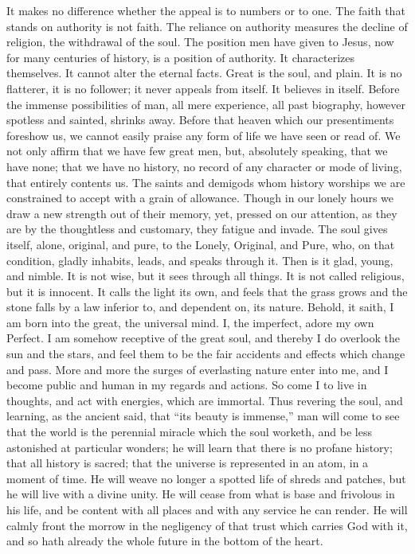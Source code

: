 \documentclass{article}
\begin{document}
It makes no difference whether the appeal is to numbers or to one. The faith that stands on authority is not faith. The reliance on authority measures the decline of religion, the withdrawal of the soul. The position men have given to Jesus, now for many centuries of history, is a position of authority. It characterizes themselves. It cannot alter the eternal facts. Great is the soul, and plain. It is no flatterer, it is no follower; it never appeals from itself. It believes in itself. Before the immense possibilities of man, all mere experience, all past biography, however spotless and sainted, shrinks away. Before that heaven which our presentiments foreshow us, we cannot easily praise any form of life we have seen or read of. We not only affirm that we have few great men, but, absolutely speaking, that we have none; that we have no history, no record of any character or mode of living, that entirely contents us. The saints and demigods whom history worships we are constrained to accept with a grain of allowance. Though in our lonely hours we draw a new strength out of their memory, yet, pressed on our attention, as they are by the thoughtless and customary, they fatigue and invade. The soul gives itself, alone, original, and pure, to the Lonely, Original, and Pure, who, on that condition, gladly inhabits, leads, and speaks through it. Then is it glad, young, and nimble. It is not wise, but it sees through all things. It is not called religious, but it is innocent. It calls the light its own, and feels that the grass grows and the stone falls by a law inferior to, and dependent on, its nature. Behold, it saith, I am born into the great, the universal mind. I, the imperfect, adore my own Perfect. I am somehow receptive of the great soul, and thereby I do overlook the sun and the stars, and feel them to be the fair accidents and effects which change and pass. More and more the surges of everlasting nature enter into me, and I become public and human in my regards and actions. So come I to live in thoughts, and act with energies, which are immortal. Thus revering the soul, and learning, as the ancient said, that ``its beauty is immense,'' man will come to see that the world is the perennial miracle which the soul worketh, and be less astonished at particular wonders; he will learn that there is no profane history; that all history is sacred; that the universe is represented in an atom, in a moment of time. He will weave no longer a spotted life of shreds and patches, but he will live with a divine unity. He will cease from what is base and frivolous in his life, and be content with all places and with any service he can render. He will calmly front the morrow in the negligency of that trust which carries God with it, and so hath already the whole future in the bottom of the heart.
\label{theend}
\end{document}

